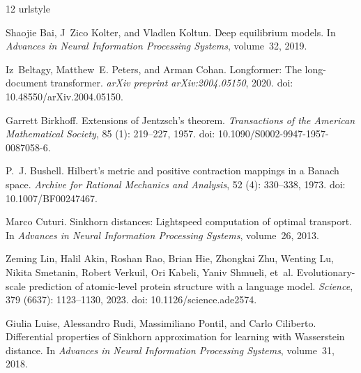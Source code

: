 \documentclass{article}
\begin{document}
\begin{thebibliography}{12}
\providecommand{\natexlab}[1]{#1}
\providecommand{\url}[1]{\texttt{#1}}
\expandafter\ifx\csname urlstyle\endcsname\relax
  \providecommand{\doi}[1]{doi: #1}\else
  \providecommand{\doi}{doi: \begingroup \urlstyle{rm}\Url}\fi

Shaojie Bai, J~Zico Kolter, and Vladlen Koltun.
\newblock Deep equilibrium models.
\newblock In \emph{Advances in Neural Information Processing Systems},
  volume~32, 2019.

Iz~Beltagy, Matthew~E. Peters, and Arman Cohan.
\newblock Longformer: The long-document transformer.
\newblock \emph{arXiv preprint arXiv:2004.05150}, 2020.
\newblock \doi{10.48550/arXiv.2004.05150}.

Garrett Birkhoff.
\newblock Extensions of {J}entzsch's theorem.
\newblock \emph{Transactions of the American Mathematical Society}, 85
  (1): 219--227, 1957.
\newblock \doi{10.1090/S0002-9947-1957-0087058-6}.

P.~J. Bushell.
\newblock Hilbert's metric and positive contraction mappings in a {B}anach
  space.
\newblock \emph{Archive for Rational Mechanics and Analysis}, 52
  (4): 330--338, 1973.
\newblock \doi{10.1007/BF00247467}.

Marco Cuturi.
\newblock Sinkhorn distances: Lightspeed computation of optimal transport.
\newblock In \emph{Advances in Neural Information Processing Systems},
  volume~26, 2013.

Zeming Lin, Halil Akin, Roshan Rao, Brian Hie, Zhongkai Zhu, Wenting Lu, Nikita
  Smetanin, Robert Verkuil, Ori Kabeli, Yaniv Shmueli, et~al.
\newblock Evolutionary-scale prediction of atomic-level protein structure with
  a language model.
\newblock \emph{Science}, 379 (6637): 1123--1130, 2023.
\newblock \doi{10.1126/science.ade2574}.

Giulia Luise, Alessandro Rudi, Massimiliano Pontil, and Carlo Ciliberto.
\newblock Differential properties of {S}inkhorn approximation for learning with
  {W}asserstein distance.
\newblock In \emph{Advances in Neural Information Processing Systems},
  volume~31, 2018.


\end{thebibliography}
\end{document}
